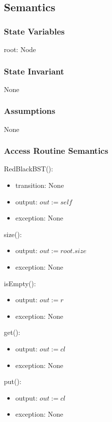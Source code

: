 \documentclass[12pt]{article}
\begin{document}
\subsection* {Semantics}

\subsubsection* {State Variables}

root: Node

\subsubsection* {State Invariant}

None

\subsubsection* {Assumptions}

None

\subsubsection* {Access Routine Semantics}

RedBlackBST():
\begin{itemize}
\item transition: None
\item output: $out := \mathit{self}$
\item exception: None
\end{itemize}

\noindent size():
\begin{itemize}
\item output: $out := root.size$
\item exception: None
\end{itemize}

\noindent isEmpty():
\begin{itemize}
\item output: $out := r$
\item exception: None
\end{itemize}

\noindent get():
\begin{itemize}
\item output: $out := cl$
\item exception: None
\end{itemize}

\noindent put():
\begin{itemize}
\item output: $out := cl$
\item exception: None
\end{itemize}
\end{document}
